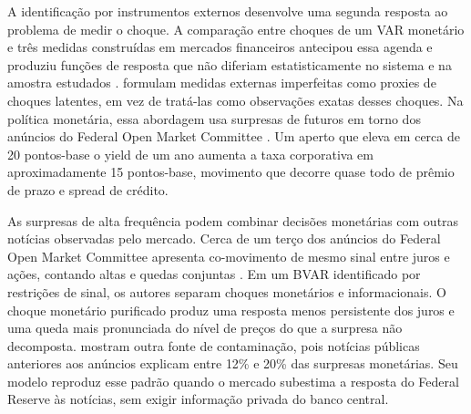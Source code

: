 \documentclass[preprint,authoryear,review,12pt]{elsarticle}
\begin{document}
A identificação por instrumentos externos desenvolve uma segunda resposta ao problema de medir o choque. A comparação entre choques de um VAR monetário e três medidas construídas em mercados financeiros antecipou essa agenda e produziu funções de resposta que não diferiam estatisticamente no sistema e na amostra estudados \citep{bagliano1998}. \cite{mertensravn2013} formulam medidas externas imperfeitas como proxies de choques latentes, em vez de tratá-las como observações exatas desses choques. Na política monetária, essa abordagem usa surpresas de futuros em torno dos anúncios do Federal Open Market Committee \citep{gertler2015}. Um aperto que eleva em cerca de 20 pontos-base o yield de um ano aumenta a taxa corporativa em aproximadamente 15 pontos-base, movimento que decorre quase todo de prêmio de prazo e spread de crédito.

As surpresas de alta frequência podem combinar decisões monetárias com outras notícias observadas pelo mercado. Cerca de um terço dos anúncios do Federal Open Market Committee apresenta co-movimento de mesmo sinal entre juros e ações, contando altas e quedas conjuntas \citep{jarocinski2020}. Em um BVAR identificado por restrições de sinal, os autores separam choques monetários e informacionais. O choque monetário purificado produz uma resposta menos persistente dos juros e uma queda mais pronunciada do nível de preços do que a surpresa não decomposta. \cite{bauer2023} mostram outra fonte de contaminação, pois notícias públicas anteriores aos anúncios explicam entre 12\% e 20\% das surpresas monetárias. Seu modelo reproduz esse padrão quando o mercado subestima a resposta do Federal Reserve às notícias, sem exigir informação privada do banco central.

\end{document}
